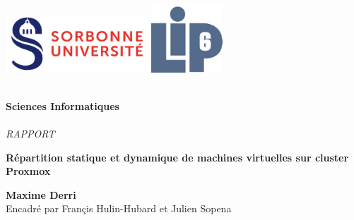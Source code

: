 \documentclass[14pt]{extarticle}
\begin{document}
\begin{titlepage}
    \begin{center}
        \includegraphics[width=0.4\textwidth]{img/su.png}
        \hspace{4cm}
        \includegraphics[width=0.2\textwidth]{img/LIP6.png}

        {\Large \textbf{\\Sciences Informatiques\\}
        \textit{\\RAPPORT\\}}
        \vspace{0.2cm}
        {\large {}}

        \vfill
       
        {\Large \textbf{Répartition statique et dynamique de machines virtuelles sur cluster Proxmox\\}}

        \vspace{1cm}
       
        \textbf{Maxime Derri\\}
        Encadré par Françis Hulin-Hubard et Julien Sopena\\

       \vfill
    \end{center}
\end{titlepage}



\tableofcontents
\newpage
\end{document}
